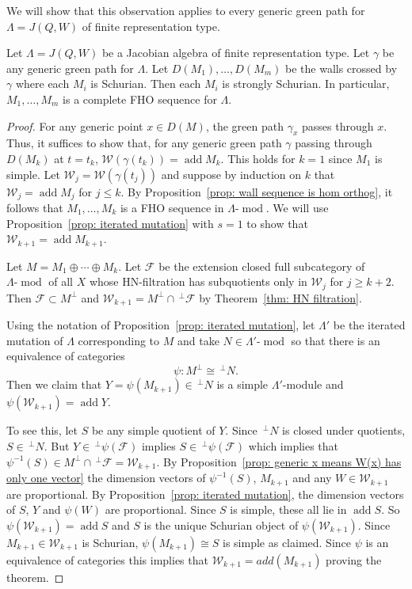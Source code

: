 \documentclass[ALCO,ThmDefs,Unicode,epreuves]{cedram}
\DeclareMathOperator{\add}{add}
\DeclareMathOperator{\modr}{mod}
\newcommand{\cF}{\ensuremath{{\mathcal{F}}}}
\newcommand{\cW}{\ensuremath{{\mathcal{W}}}}
\begin{document}
We will show that this observation applies to every generic green path for $\Lambda=J(Q,W)$ of finite representation type.



\begin{theo}\label{thm: walls are strongly Schurian}
Let $\Lambda=J(Q,W)$ be a Jacobian algebra of finite representation type. Let $\gamma$ be any generic green path for $\Lambda$. Let $D(M_1),\ldots,D(M_m)$ be the walls crossed by $\gamma$ where each $M_i$ is Schurian. Then each $M_i$ is strongly Schurian. In particular, $M_1,\ldots,M_m$ is a complete FHO sequence for $\Lambda$.
\end{theo}


\begin{proof} For any generic point $x\in D(M)$, the green path $\gamma_x$ passes through $x$. Thus, it suffices to show that, for any generic green path $\gamma$ passing through $D(M_k)$ at $t=t_k$, $\cW(\gamma(t_k))=\add M_k$. This holds for $k=1$ since $M_1$ is simple. Let $\cW_j=\cW(\gamma(t_j))$ and suppose by induction on $k$ that $\cW_j=\add  M_j$ for $j\le k$. By Proposition~\ref{prop: wall sequence is hom orthog}, it follows that $M_1,\ldots,M_{k}$ is a FHO sequence in $\Lambda$-$\modr$. We will use Proposition~\ref{prop: iterated mutation} with $s=1$ to show that $\cW_{k+1}=\add  M_{k+1}$. 


Let $M=M_1\oplus\cdots \oplus M_k$. Let $\cF$ be the extension closed full subcategory of $\Lambda\text{-}\modr $ of all $X$ whose HN-filtration has subquotients only in $\cW_j$ for $j\ge k+2$. Then $\cF\subset M^\perp$ and $\cW_{k+1}=M^\perp\cap \,^\perp\cF$ by Theorem~\ref{thm: HN filtration}.

Using the notation of Proposition~\ref{prop: iterated mutation}, let $\Lambda'$ be the iterated mutation of $\Lambda$ corresponding to $M$ and take $N\in \Lambda'\text{-}\modr $ so that there is an equivalence of categories 
\[
\psi:M^\perp\cong \,^{\perp}N.\]
Then we claim that $Y=\psi(M_{k+1})\in\,^{\perp}N$ is a simple $\Lambda'$-module and $\psi(\cW_{k+1})=\add  Y$.


To see this, let $S$ be any simple quotient of $Y$. Since $\,^{\perp}N$ is closed under quotients, $S\in\,^{\perp}N$. But $Y\in \,^{\perp}\psi(\cF)$ implies $S\in \,^{\perp}\psi(\cF)$ which implies that $\psi^{-1}(S)\in M^\perp\cap \,^\perp \cF=\cW_{k+1}$. By Proposition~\ref{prop: generic x means W(x) has only one vector} the dimension vectors of $\psi^{-1}(S)$, $M_{k+1}$ and any $W\in \cW_{k+1}$ are proportional. By Proposition~\ref{prop: iterated mutation}, the dimension vectors of $S$, $Y$ and $\psi(W)$ are proportional. Since $S$ is simple, these all lie in $\add  S$. So $\psi(\cW_{k+1})=\add  S$ and $S$ is the unique Schurian object of $\psi(\cW_{k+1})$. Since $M_{k+1}\in \cW_{k+1}$ is Schurian, $\psi(M_{k+1})\cong S$ is simple as claimed. Since $\psi$ is an equivalence of categories this implies that $\cW_{k+1}=add(M_{k+1})$ proving the theorem.
\end{proof}
\end{document}
